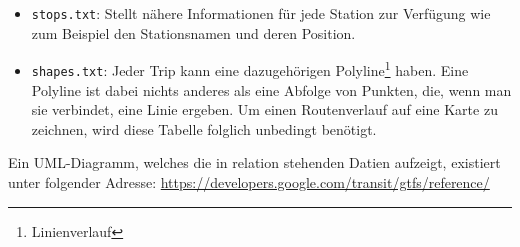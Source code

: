 \begin{newpage}
\begin{itemize}
			\item \texttt{stops.txt}: Stellt nähere Informationen für jede Station zur Verfügung wie zum Beispiel den Stationsnamen und deren Position.

			\item \texttt{shapes.txt}: Jeder Trip kann eine dazugehörigen Polyline\footnote{Linienverlauf} haben. Eine Polyline ist dabei nichts anderes als eine Abfolge von Punkten, die, wenn man sie verbindet, eine Linie ergeben. Um einen Routenverlauf auf eine Karte zu zeichnen, wird diese Tabelle folglich unbedingt benötigt. 
		\end{itemize}

  Ein UML-Diagramm, welches die in relation stehenden Datien aufzeigt, existiert unter folgender Adresse: \url{https://developers.google.com/transit/gtfs/reference/} 

\end{newpage}
